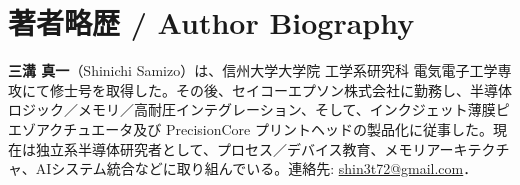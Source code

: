 \documentclass[10pt,conference]{IEEEtran}
\begin{document}
\section*{著者略歴 / Author Biography}
\noindent\textbf{三溝 真一}（Shinichi Samizo）は、信州大学大学院 工学系研究科 電気電子工学専攻にて修士号を取得した。その後、セイコーエプソン株式会社に勤務し、半導体ロジック／メモリ／高耐圧インテグレーション、そして、インクジェット薄膜ピエゾアクチュエータ及び PrecisionCore プリントヘッドの製品化に従事した。現在は独立系半導体研究者として、プロセス／デバイス教育、メモリアーキテクチャ、AIシステム統合などに取り組んでいる。連絡先: \href{mailto:shin3t72@gmail.com}{shin3t72@gmail.com}．
\end{document}
